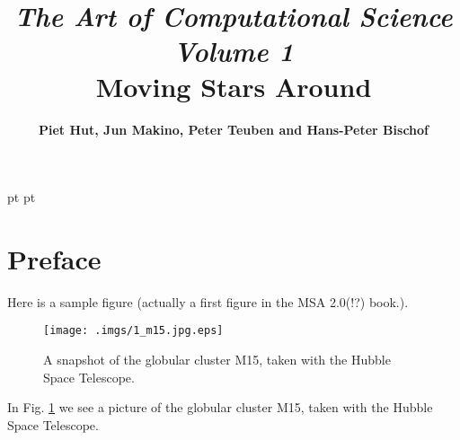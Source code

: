 \documentclass{book}
\begin{document}
 pt
 pt



\title{{\sl \huge The Art of Computational Science}\\
\bigskip
{\sl Volume 1}\\
\bigskip
\bigskip
\bigskip
\bigskip
\bigskip
\bf Moving Stars Around
\bigskip
}
\author{\bf Piet Hut, Jun Makino, Peter Teuben and Hans-Peter Bischof}


\maketitle
\thispagestyle{empty}


\newpage\tableofcontents\newpage


\chapter*{  Preface}
\label{sect:1}

Here is a sample figure (actually a first figure in the MSA 2.0(!?)
book.).

\begin{figure}
\begin{center}
    \texttt{[image: .imgs/1\_m15.jpg.eps]}
\caption{ A snapshot of the globular cluster M15, taken with the Hubble Space
 Telescope.
\protect\footnotemark[42]
}
\label{m15}
\end{center}
\end{figure}

In Fig. \ref{m15} we see a
picture of the globular cluster M15, taken with the Hubble Space
Telescope.
\end{document}
